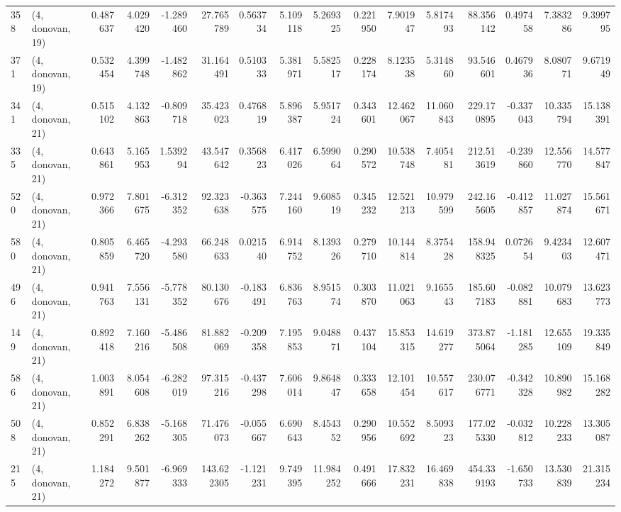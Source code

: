 \begin{tabular}{llrrrrrrrrrrrrrr}
358 &  (4, donovan, 19) &   0.487637 &   4.029420 &  -1.289460 &    27.765789 &   0.563734 &   5.109118 &   5.269325 &  0.221950 &   7.901947 &   5.817493 &     88.356142 &   0.497458 &   7.383286 &    9.399795 \\
371 &  (4, donovan, 19) &   0.532454 &   4.399748 &  -1.482862 &    31.164491 &   0.510333 &   5.381971 &   5.582517 &  0.228174 &   8.123538 &   5.314860 &     93.546601 &   0.467936 &   8.080771 &    9.671949 \\
341 &  (4, donovan, 21) &   0.515102 &   4.132863 &  -0.809718 &    35.423023 &   0.476819 &   5.896387 &   5.951724 &  0.343601 &  12.462067 &  11.060843 &    229.170895 &  -0.337043 &  10.335794 &   15.138391 \\
335 &  (4, donovan, 21) &   0.643861 &   5.165953 &   1.539294 &    43.547642 &   0.356823 &   6.417026 &   6.599064 &  0.290572 &  10.538748 &   7.405481 &    212.513619 &  -0.239860 &  12.556770 &   14.577847 \\
520 &  (4, donovan, 21) &   0.972366 &   7.801675 &  -6.312352 &    92.323638 &  -0.363575 &   7.244160 &   9.608519 &  0.345232 &  12.521213 &  10.979599 &    242.165605 &  -0.412857 &  11.027874 &   15.561671 \\
580 &  (4, donovan, 21) &   0.805859 &   6.465720 &  -4.293580 &    66.248633 &   0.021540 &   6.914752 &   8.139326 &  0.279710 &  10.144814 &   8.375428 &    158.948325 &   0.072654 &   9.423403 &   12.607471 \\
496 &  (4, donovan, 21) &   0.941763 &   7.556131 &  -5.778352 &    80.130676 &  -0.183491 &   6.836763 &   8.951574 &  0.303870 &  11.021063 &   9.165543 &    185.607183 &  -0.082881 &  10.079683 &   13.623773 \\
149 &  (4, donovan, 21) &   0.892418 &   7.160216 &  -5.486508 &    81.882069 &  -0.209358 &   7.195853 &   9.048871 &  0.437104 &  15.853315 &  14.619277 &    373.875064 &  -1.181285 &  12.655109 &   19.335849 \\
586 &  (4, donovan, 21) &   1.003891 &   8.054608 &  -6.282019 &    97.315216 &  -0.437298 &   7.606014 &   9.864847 &  0.333658 &  12.101454 &  10.557617 &    230.076771 &  -0.342328 &  10.890982 &   15.168282 \\
508 &  (4, donovan, 21) &   0.852291 &   6.838262 &  -5.168305 &    71.476073 &  -0.055667 &   6.690643 &   8.454352 &  0.290956 &  10.552692 &   8.509323 &    177.025330 &  -0.032812 &  10.228233 &   13.305087 \\
215 &  (4, donovan, 21) &   1.184272 &   9.501877 &  -6.969333 &   143.622305 &  -1.121231 &   9.749395 &  11.984252 &  0.491666 &  17.832231 &  16.469838 &    454.339193 &  -1.650733 &  13.530839 &   21.315234 \\

\end{tabular}
